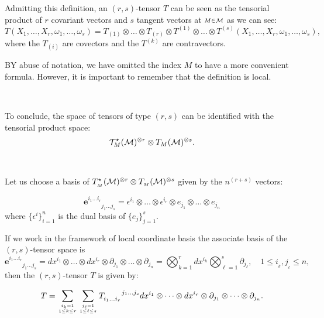 Admitting this definition, an $(r,s)$-tensor $T$ can be seen as the tensorial product of $r$ covariant vectors and $s$ tangent vectors at $\scriptstyle M \in \mathcal{M}$ as we can see: 
\[
T(X_{1},\dots,X_{r},\omega_{1},\dots,\omega_{s})= T_{(1)}\otimes\dots\otimes T_{(r)}\otimes T^{(1)}\otimes\dots\otimes T^{(s)}(X_{1},\dots,X_{r},\omega_{1},\dots,\omega_{s}),\]
where the $T_{(i)}$ are covectors and the $T^{(k)}$ are contravectors. 

BY abuse of notation, we have omitted the index $\scriptscriptstyle M$ to have a more convenient formula. However, it is important to remember that the definition is local.

\,

To conclude, the space of tensors of type $(r,s)$ can be identified with the tensorial product space:	
\[ \mathcal{T}_{\scriptstyle M}^{\star}(\mathcal{M})^{\otimes r} \otimes T_{\scriptstyle M}(\mathcal{M})^{\otimes s }.\]	

\,


Let us choose a basis of $ T_{_{M}}^{\star}(\mathcal{M})^{\otimes r} \otimes T_{_{M}}(\mathcal{M})^{\otimes s }$ given by the $n^{(r+s)}$ vectors:

\begin{equation}
 \mathbf{e}^{i_{1}\dots i_{r}}_{\phantom{i_{1}\dots i_{r}}j_{1}\dots j_{s}}= \epsilon^{i_{1}}\otimes\dots\otimes\epsilon^{i_{r}}\otimes e_{j_{1}}\otimes\dots\otimes e_{j_{n}}\end{equation}  
where $\{\epsilon^{i}\}_{i=1}^{n}$ is the dual basis of  $\{e_{j}\}_{j=1}^{s}$.

\vspace{3pt}

If we work in the framework of local coordinate basis the associate basis of the $(r,s)$-tensor space is
\[
\mathbf{e}^{i_{1}\dots i_{r}}_{\phantom{i_{1}\dots i_{r}}j_{1}\dots j_{s}}=dx^{i_{1}}\otimes\dots\otimes dx^{i_{r}}\otimes \partial_{j_{1}}\otimes\dots\otimes \partial_{j_{n}}=\bigotimes_{k=1}^{r}dx^{i_{k}} \bigotimes_{\ell=1}^{s}\partial_{j_{\ell}}, \quad 1\leq i_{_{k}}, j_{_{\ell}}\leq n,
\]
 then the  $(r,s)$-tensor $T$ is given by:

\begin{equation}
T=\sum_{i_{k}=1\atop 1\leq k\leq r}\sum_{j_{\ell}=1\atop 1\leq\ell\leq s}T_{i_{1}\dots i_{r}}^{\phantom{i_{1}\dots i_{r}}j_{1}\dots j_{s}}dx^{i_{1}}\otimes\dots\otimes dx^{i_{r}}\otimes \partial_{j_{1}}\otimes\dots\otimes \partial_{j_{n}}.
\end{equation}

